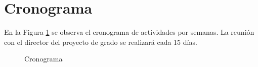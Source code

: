 \section{Cronograma}

\noindent En la Figura \ref{fig:cronograma} se observa el cronograma de
actividades por semanas. La reuni\'on con el director del proyecto de grado se
realizar\'a cada 15 d\'ias.


\begin{landscape}
    \begin{figure}[!h]
        \centering   
            \vspace*{2 cm}
            \scalebox{0.8}{
                
            }
        \caption{Cronograma}
        \label{fig:cronograma}
    \end{figure}
\end{landscape}
